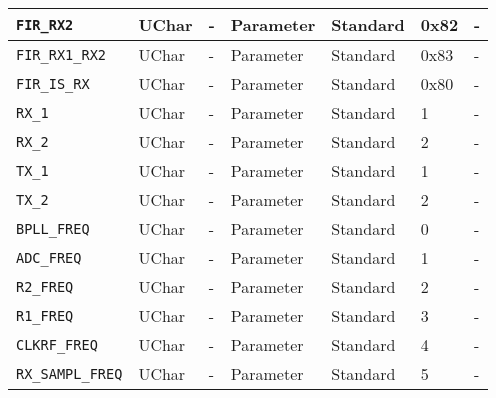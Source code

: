 \documentclass{article}
\begin{document}
\begin{landscape}
\begin{scriptsize}
\begin{longtable}{|p{3.6cm}|p{8.1cm}|p{1.4cm}|p{1.3cm}|p{1.4cm}|p{2.5cm}|p{3.6cm}|}
			\hline
      \verb+FIR_RX2+                   & UChar        & -               & Parameter             & Standard                         & 0x82                & - \\
			\hline
      \verb+FIR_RX1_RX2+               & UChar        & -               & Parameter             & Standard                         & 0x83                & - \\
			\hline
      \verb+FIR_IS_RX+                 & UChar        & -               & Parameter             & Standard                         & 0x80                & - \\
			\hline
      \verb+RX_1+                      & UChar        & -               & Parameter             & Standard                         & 1                   & - \\
			\hline
      \verb+RX_2+                      & UChar        & -               & Parameter             & Standard                         & 2                   & - \\
			\hline
      \verb+TX_1+                      & UChar        & -               & Parameter             & Standard                         & 1                   & - \\
			\hline
      \verb+TX_2+                      & UChar        & -               & Parameter             & Standard                         & 2                   & - \\
			\hline
      \verb+BPLL_FREQ+                 & UChar        & -               & Parameter             & Standard                         & 0                   & - \\
			\hline
      \verb+ADC_FREQ+                  & UChar        & -               & Parameter             & Standard                         & 1                   & - \\
			\hline
      \verb+R2_FREQ+                   & UChar        & -               & Parameter             & Standard                         & 2                   & - \\
			\hline
      \verb+R1_FREQ+                   & UChar        & -               & Parameter             & Standard                         & 3                   & - \\
			\hline
      \verb+CLKRF_FREQ+                & UChar        & -               & Parameter             & Standard                         & 4                   & - \\
			\hline
      \verb+RX_SAMPL_FREQ+             & UChar        & -               & Parameter             & Standard                         & 5                   & - \\

\end{longtable}
\end{scriptsize}
\end{landscape}
\end{document}
